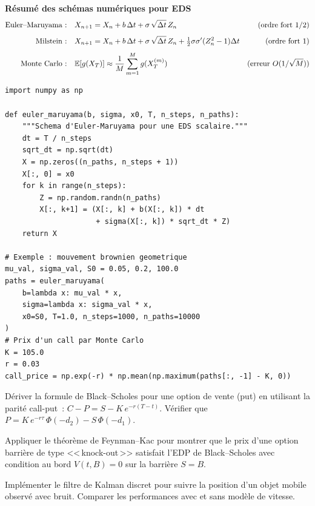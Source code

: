 \begin{formules}
\textbf{R\'esum\'e des sch\'emas num\'eriques pour EDS}
\begin{align*}
  \text{Euler--Maruyama :}\quad & X_{n+1} = X_n + b\,\Delta t
    + \sigma\,\sqrt{\Delta t}\,Z_n
    & \text{(ordre fort } 1/2\text{)} \\[4pt]
  \text{Milstein :}\quad & X_{n+1} = X_n + b\,\Delta t
    + \sigma\,\sqrt{\Delta t}\,Z_n
    + \tfrac{1}{2}\sigma\sigma'(Z_n^2-1)\Delta t
    & \text{(ordre fort } 1\text{)} \\[4pt]
  \text{Monte Carlo :}\quad & \mathbb{E}[g(X_T)] \approx \frac{1}{M}\sum_{m=1}^M
    g(X_T^{(m)})
    & \text{(erreur } O(1/\sqrt{M})\text{)}
\end{align*}
\end{formules}

\begin{verbatim}
import numpy as np

def euler_maruyama(b, sigma, x0, T, n_steps, n_paths):
    """Schema d'Euler-Maruyama pour une EDS scalaire."""
    dt = T / n_steps
    sqrt_dt = np.sqrt(dt)
    X = np.zeros((n_paths, n_steps + 1))
    X[:, 0] = x0
    for k in range(n_steps):
        Z = np.random.randn(n_paths)
        X[:, k+1] = (X[:, k] + b(X[:, k]) * dt
                     + sigma(X[:, k]) * sqrt_dt * Z)
    return X

# Exemple : mouvement brownien geometrique
mu_val, sigma_val, S0 = 0.05, 0.2, 100.0
paths = euler_maruyama(
    b=lambda x: mu_val * x,
    sigma=lambda x: sigma_val * x,
    x0=S0, T=1.0, n_steps=1000, n_paths=10000
)
# Prix d'un call par Monte Carlo
K = 105.0
r = 0.03
call_price = np.exp(-r) * np.mean(np.maximum(paths[:, -1] - K, 0))
\end{verbatim}

\begin{exercice}
D\'eriver la formule de Black--Scholes pour une option de vente (put)
en utilisant la parit\'e call-put~: $C - P = S - K\,e^{-r(T-t)}$.
V\'erifier que $P = K\,e^{-r\tau}\,\Phi(-d_2) - S\,\Phi(-d_1)$.
\end{exercice}

\begin{exercice}
Appliquer le th\'eor\`eme de Feynman--Kac pour montrer que le prix d'une
option barri\`ere de type <<\,knock-out\,>> satisfait l'EDP de Black--Scholes
avec condition au bord $V(t, B) = 0$ sur la barri\`ere $S = B$.
\end{exercice}

\begin{exercice}
Impl\'ementer le filtre de Kalman discret pour suivre la position d'un
objet mobile observ\'e avec bruit. Comparer les performances avec et sans
mod\`ele de vitesse.
\end{exercice}

